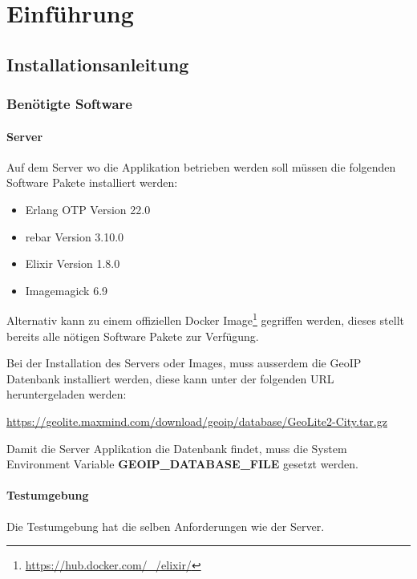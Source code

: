 \chapter{Einführung}\label{AppendixEinführung}

\section{Installationsanleitung}

\subsection{Benötigte Software}

\subsubsection{Server}

Auf dem Server wo die Applikation betrieben werden soll müssen die folgenden
Software Pakete installiert werden:

\begin{itemize}
	\tightlist{}
	\item{} Erlang OTP Version 22.0
	\item{} rebar Version 3.10.0
	\item{} Elixir Version 1.8.0
	\item{} Imagemagick 6.9
\end{itemize}

Alternativ kann zu einem offiziellen Docker Image\footnote{\url{https://hub.docker.com/\_/elixir/}}
gegriffen werden, dieses stellt bereits alle nötigen Software Pakete zur
Verfügung.

Bei der Installation des Servers oder Images, muss ausserdem die GeoIP
Datenbank installiert werden, diese kann unter der folgenden URL
heruntergeladen werden:

\url{https://geolite.maxmind.com/download/geoip/database/GeoLite2-City.tar.gz}

Damit die Server Applikation die Datenbank findet, muss die System Environment
Variable \textbf{GEOIP\_DATABASE\_FILE} gesetzt werden.

\subsubsection{Testumgebung}

Die Testumgebung hat die selben Anforderungen wie der Server.



